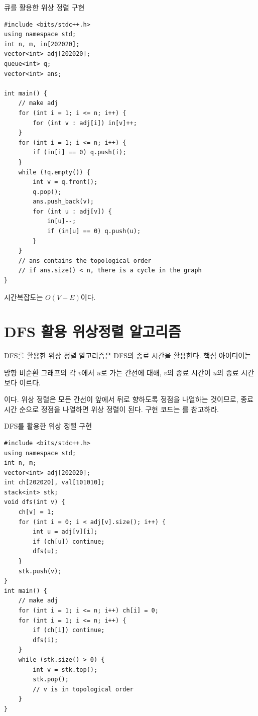 \begin{code} \label{code: queue-topology-sort}
큐를 활용한 위상 정렬 구현
\begin{lstlisting}
#include <bits/stdc++.h>
using namespace std;
int n, m, in[202020];
vector<int> adj[202020];
queue<int> q;
vector<int> ans;

int main() {
    // make adj
    for (int i = 1; i <= n; i++) {
        for (int v : adj[i]) in[v]++;
    }
    for (int i = 1; i <= n; i++) {
        if (in[i] == 0) q.push(i);
    }
    while (!q.empty()) {
        int v = q.front();
        q.pop();
        ans.push_back(v);
        for (int u : adj[v]) {
            in[u]--;
            if (in[u] == 0) q.push(u);
        }
    }
    // ans contains the topological order
    // if ans.size() < n, there is a cycle in the graph
}
\end{lstlisting}
\end{code}

시간복잡도는 $O(V+E)$이다.

\section{DFS 활용 위상정렬 알고리즘}
DFS를 활용한 위상 정렬 알고리즘은 DFS의 종료 시간을 활용한다. 핵심 아이디어는
\begin{obs}
    방향 비순환 그래프의 각 $v$에서 $u$로 가는 간선에 대해, $v$의 종료 시간이 $u$의 종료 시간보다 이르다.
\end{obs}
이다. 위상 정렬은 모든 간선이 앞에서 뒤로 향하도록 정점을 나열하는 것이므로, 종료 시간 순으로 정점을 나열하면 위상 정렬이 된다. 구현 코드는 를 참고하라.

\begin{code} \label{code: dfs-topology-sort}
DFS를 활용한 위상 정렬 구현
\begin{lstlisting}
#include <bits/stdc++.h>
using namespace std;
int n, m;
vector<int> adj[202020];
int ch[202020], val[101010];
stack<int> stk;
void dfs(int v) {
    ch[v] = 1;
    for (int i = 0; i < adj[v].size(); i++) {
        int u = adj[v][i];
        if (ch[u]) continue;
        dfs(u);
    }
    stk.push(v);
}
int main() {
    // make adj
    for (int i = 1; i <= n; i++) ch[i] = 0;
    for (int i = 1; i <= n; i++) {
        if (ch[i]) continue;
        dfs(i);
    }
    while (stk.size() > 0) {
        int v = stk.top();
        stk.pop();
        // v is in topological order
    }
}
\end{lstlisting}
\end{code}

